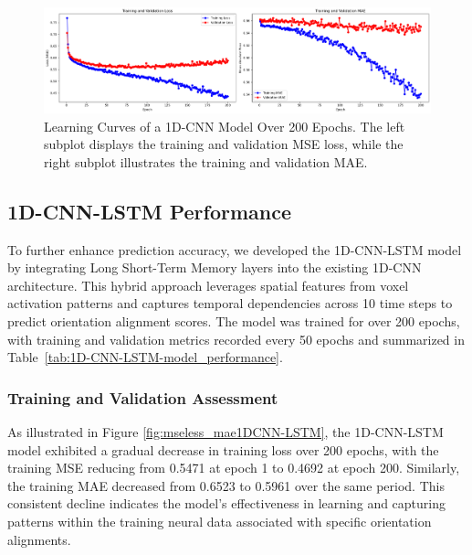 \documentclass[a4paper]{article}
\begin{document}
\begin{figure}
    \centering
    \includegraphics[width=1\linewidth]{MSE_MAE_1D.png}
    \caption{Learning Curves of a 1D-CNN Model Over 200 Epochs. The left subplot displays the training and validation MSE loss, while the right subplot illustrates the training and validation MAE.}
    \label{fig:updated1Dmse}
\end{figure}



\subsection{\textbf{1D-CNN-LSTM Performance}}

 To further enhance prediction accuracy, we developed the 1D-CNN-LSTM model by integrating Long Short-Term Memory layers into the existing 1D-CNN architecture. This hybrid approach leverages spatial features from voxel activation patterns and captures temporal dependencies across 10 time steps to predict orientation alignment scores. The model was trained for over 200 epochs, with training and validation metrics recorded every 50 epochs and summarized in Table~\ref{tab:1D-CNN-LSTM-model_performance}.

\subsubsection{Training and Validation Assessment}

As illustrated in Figure \ref{fig:mseless_mae1DCNN-LSTM}, the 1D-CNN-LSTM model exhibited a gradual decrease in training loss over 200 epochs, with the training MSE reducing from 0.5471 at epoch 1 to 0.4692 at epoch 200. Similarly, the training MAE decreased from 0.6523 to 0.5961 over the same period. This consistent decline indicates the model's effectiveness in learning and capturing patterns within the training neural data associated with specific orientation alignments.\\
\end{document}
